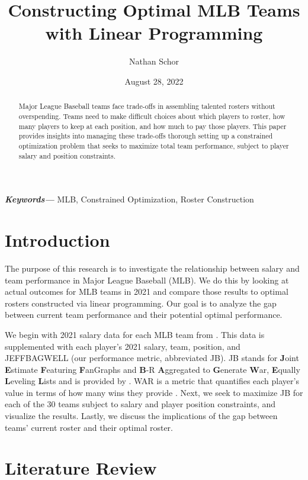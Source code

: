 \documentclass{article}
\title{Constructing Optimal MLB Teams with Linear Programming}
\author{Nathan Schor}
\date{August 28, 2022}
\begin{document}
\providecommand{\keywords}[1]
{
  \small	
  \textbf{\textit{Keywords---}} #1
}

\maketitle
\begin{abstract}
Major League Baseball teams face trade-offs in assembling talented rosters without overspending. Teams need to make difficult choices about which players to roster, how many players to keep at each position, and how much to pay those players. This paper provides insights into managing these trade-offs thorough setting up a constrained optimization problem that seeks to maximize total team performance, subject to player salary and position constraints. 
\end{abstract}
\keywords{MLB, Constrained Optimization, Roster Construction}
\newpage
\tableofcontents
\newpage
\section{Introduction}

The purpose of this research is to investigate the relationship between salary and team performance in Major League Baseball (MLB). We do this by looking at actual outcomes for MLB teams in 2021 and compare those results to optimal rosters constructed via linear programming. Our goal is to analyze the gap between current team performance and their potential optimal performance. 

We begin with 2021 salary data for each MLB team from \cite{Brown2021}. This data is supplemented with each player's 2021 salary, team, position, and JEFFBAGWELL (our performance metric, abbreviated JB). JB stands for \textbf{J}oint \textbf{E}stimate \textbf{F}eaturing \textbf{F}anGraphs and \textbf{B}-R \textbf{A}ggregated to \textbf{G}enerate \textbf{W}ar, \textbf{E}qually \textbf{L}eveling \textbf{L}ists and is provided by \cite{JB}. WAR is a metric that quantifies each player's value in terms of how many wins they provide \cite{WAR}. Next, we seek to maximize JB for each of the 30 teams subject to salary and player position constraints, and visualize the results. Lastly, we discuss the implications of the gap between teams' current roster and their optimal roster.

\section{Literature Review}
\end{document}
